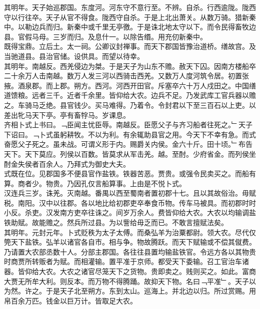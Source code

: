 \documentclass{zhvt-classic}
\begin{document}
\hspace*{2em}其明年。天子始巡郡国。东度河。河东守不意行至。不辨。自杀。行西逾陇。陇西守以行往卒。天子从官不得食。陇西守自杀。于是上北出萧关。从数万骑。猎新秦中。以勒边兵而归。新秦中或千里无亭徼。于是诛北地太守以下。而令民得畜牧边县。官假马母。三岁而归。及息什一。以除告缗。用充仞新秦中。\\
\hspace*{2em}既得宝鼎。立后土。太一祠。公卿议封禅事。而天下郡国皆豫治道桥。缮故宫。及当驰道县。县治官储。设供具。而望以待幸。\\
\hspace*{2em}其明年。南越反。西羌侵边为桀。于是天子为山东不赡。赦天下囚。因南方楼船卒二十余万人击南越。数万人发三河以西骑击西羌。又数万人度河筑令居。初置张掖。酒泉郡。而上郡。朔方。西河。河西开田官。斥塞卒六十万人戍田之。中国缮道馈粮。远者三千。近者千余里。皆仰给大农。边兵不足。乃发武库工官兵器以赡之。车骑马乏绝。县官钱少。买马难得。乃着令。令封君以下至三百石以上吏。以差出牝马天下亭。亭有畜牸马。岁课息。\\
\hspace*{2em}齐相卜式上书曰。﹁臣闻主忧臣辱。南越反。臣愿父子与齐习船者往死之。﹂天子下诏曰。﹁卜式虽躬耕牧。不以为利。有余辄助县官之用。今天下不幸有急。而式奋愿父子死之。虽未战。可谓义形于内。赐爵关内侯。金六十斤。田十顷。﹂布告天下。天下莫应。列侯以百数。皆莫求从军击羌。越。至酎。少府省金。而列侯坐酎金失侯者百余人。乃拜式为御史大夫。\\
\hspace*{2em}式既在位。见郡国多不便县官作盐铁。铁器苦恶。贾贵。或强令民卖买之。而船有算。商者少。物贵。乃因孔仅言船算事。上由是不悦卜式。\\
\hspace*{2em}汉连兵三岁。诛羌。灭南越。番禺以西至蜀南者置初郡十七。且以其故俗治。毋赋税。南阳。汉中以往郡。各以地比给初郡吏卒奉食币物。传车马被具。而初郡时时小反。杀吏。汉发南方吏卒往诛之。间岁万余人。费皆仰给大农。大农以均输调盐铁助赋。故能赡之。然兵所过县。为以訾给毋乏而已。不敢言擅赋法矣。\\
\hspace*{2em}其明年。元封元年。卜式贬秩为太子太傅。而桑弘羊为治粟都尉。领大农。尽代仅筦天下盐铁。弘羊以诸官各自市。相与争。物故腾跃。而天下赋输或不偿其僦费。乃请置大农部丞数十人。分部主郡国。各往往县置均输盐铁官。令远方各以其物贵时商贾所转贩者为赋。而相灌输。置平准于京师。都受天下委输。召工官治车诸器。皆仰给大农。大农之诸官尽笼天下之货物。贵即卖之。贱则买之。如此。富商大贾无所牟大利。则反本。而万物不得腾踊。故抑天下物。名曰﹁平准﹂。天子以为然。许之。于是天子北至朔方。东到太山。巡海上。并北边以归。所过赏赐。用帛百余万匹。钱金以巨万计。皆取足大农。\\
\end{document}
